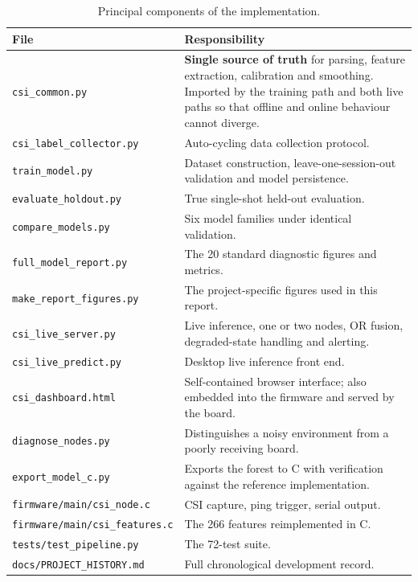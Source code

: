 \documentclass[11pt,a4paper,oneside]{report}
\newcommand{\code}[1]{\texttt{\small #1}}
\begin{document}
\begin{table}[H]
\centering
\caption{Principal components of the implementation.}
\begin{tabularx}{\linewidth}{@{}lX@{}}
\toprule
\textbf{File} & \textbf{Responsibility} \\
\midrule
\code{csi\_common.py} & \textbf{Single source of truth} for parsing, feature
extraction, calibration and smoothing. Imported by the training path and both
live paths so that offline and online behaviour cannot diverge. \\
\code{csi\_label\_collector.py} & Auto-cycling data collection protocol. \\
\code{train\_model.py} & Dataset construction, leave-one-session-out validation
and model persistence. \\
\code{evaluate\_holdout.py} & True single-shot held-out evaluation. \\
\code{compare\_models.py} & Six model families under identical validation. \\
\code{full\_model\_report.py} & The 20 standard diagnostic figures and metrics. \\
\code{make\_report\_figures.py} & The project-specific figures used in this report. \\
\code{csi\_live\_server.py} & Live inference, one or two nodes, OR fusion,
degraded-state handling and alerting. \\
\code{csi\_live\_predict.py} & Desktop live inference front end. \\
\code{csi\_dashboard.html} & Self-contained browser interface; also embedded
into the firmware and served by the board. \\
\code{diagnose\_nodes.py} & Distinguishes a noisy environment from a poorly
receiving board. \\
\code{export\_model\_c.py} & Exports the forest to C with verification against
the reference implementation. \\
\code{firmware/main/csi\_node.c} & CSI capture, ping trigger, serial output. \\
\code{firmware/main/csi\_features.c} & The 266 features reimplemented in C. \\
\code{tests/test\_pipeline.py} & The 72-test suite. \\
\code{docs/PROJECT\_HISTORY.md} & Full chronological development record. \\
\bottomrule
\end{tabularx}
\end{table}
\end{document}
